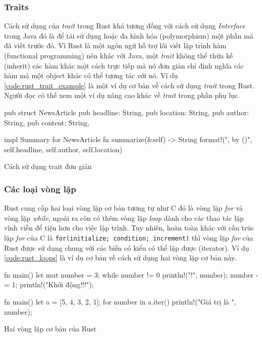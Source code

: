 \subsubsection{Traits}
Cách sử dụng của \emph{trait} trong Rust khá tương đồng với cách sử dụng \emph{Interface} trong Java đó là để tải sử dụng hoặc đa hình hóa (polymorphism) một phần mã đã viết trước đó.
Vì Rust là một ngôn ngữ hỗ trợ lối viết lập trình hàm (functional programming) nên khác với Java, một \emph{trait} không thể thừa kế (inherit) các hàm khác một cách trực tiếp mà nó đơn giản chỉ định nghĩa các hàm mà một object khác có thể tương tác với nó.
Ví dụ \ref{code:rust_trait_example} là một ví dụ cơ bản về cách sử dụng \emph{trait} trong Rust.
Người đọc có thể xem một ví dụ nâng cao khác về \emph{trait} trong phần phụ lục.%
\begin{listing}[ht]
\begin{rustcode}
pub struct NewsArticle {
    pub headline: String,
    pub location: String,
    pub author: String,
    pub content: String,
}

impl Summary for NewsArticle {
    fn summarize(&self) -> String {
        format!("{}, by {} ({})", self.headline, self.author, self.location)
    }
}
\end{rustcode}
\caption{Cách sử dụng trait đơn giản}
\label{code:rust_trait_example}
\end{listing}

\subsubsection{Các loại vòng lặp}
Rust cung cấp hai loại vòng lặp cơ bản tương tự như C đó là vòng lặp \emph{for} và vòng lặp \emph{while}, ngoài ra còn có thêm vòng lặp \emph{loop} dành cho các thao tác lặp vĩnh viễn để tiện hơn cho việc lập trình.
Tuy nhiên, hoàn toàn khác với cấu trúc lặp \emph{for} của C là \texttt{for(initialize; condition; increment)} thì vòng lặp \emph{for} của Rust được sử dụng chung với các biến có kiểu có thể lặp được (iterator).
Ví dụ \ref{code:rust_loops} là ví dụ cơ bản về cách sử dụng hai vòng lặp cơ bản này.

\begin{center}
\begin{listing}
\begin{minipage}[ht]{0.4\linewidth}
\begin{rustcode}
fn main() {
    let mut number = 3;
    while number != 0 {
        println!("{}!", number);
        number -= 1;
    }
    println!("Khởi động!!!");
}
\end{rustcode}
\end{minipage}
\qquad
\begin{minipage}[ht]{0.5\linewidth}
\begin{rustcode}
fn main() {
    let a = [5, 4, 3, 2, 1];
    for number in a.iter() {
        println!("Giá trị là {}", number);
    }
}
\end{rustcode}
\end{minipage}
\caption{Hai vòng lặp cơ bản của Rust}
\label{code:rust_loops}
\end{listing}
\end{center}

